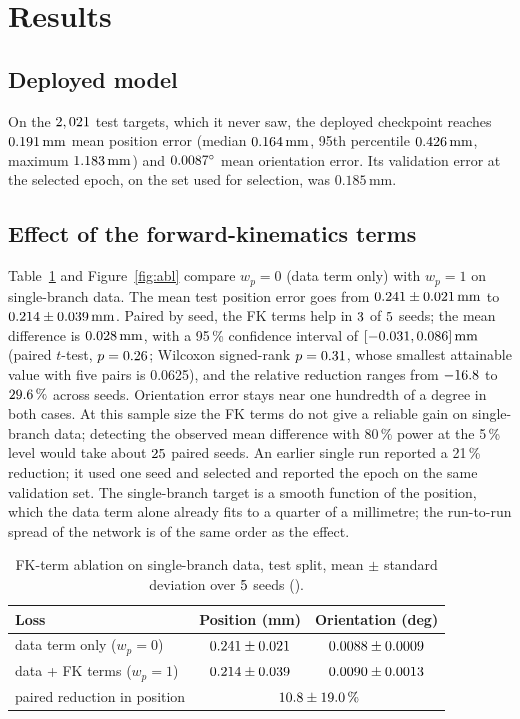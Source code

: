 \documentclass[11pt]{article}
\newcommand{\mm}{\,\mathrm{mm}}
\newcommand{\repo}[1]{\texttt{\detokenize{#1}}}
\begin{document}
\section{Results}
\label{sec:results}
\subsection{Deployed model}
On the $2,021$ test targets, which it never saw, the deployed checkpoint
reaches $\shipTestPos\mm$ mean position error (median $\shipTestMed\mm$,
95th percentile $\shipTestPninetyfive\mm$, maximum $\shipTestMax\mm$) and
$0.0087^\circ$ mean orientation error. Its validation error at the
selected epoch, on the set used for selection, was $0.185\mm$.

\subsection{Effect of the forward-kinematics terms}
Table~\ref{tab:abl} and Figure~\ref{fig:abl} compare $w_p=0$ (data term only)
with $w_p=1$ on single-branch data. The mean test position error goes from
$\ablPosZero\mm$ to $\ablPosOne\mm$. Paired by seed, the FK terms help in
$3$ of $5$ seeds; the mean difference is $\ablDiff\mm$, with a
95\,\% confidence interval of $[\ablDiffLo, \ablDiffHi]\mm$ (paired $t$-test,
$p=0.26$; Wilcoxon signed-rank $p=0.31$, whose smallest attainable
value with five pairs is 0.0625), and the relative reduction ranges from
$-16.8$ to $29.6\,\%$ across seeds. Orientation error stays near
one hundredth of a degree in both cases. At this sample size the FK terms do
not give a reliable gain on single-branch data; detecting the observed mean
difference with 80\,\% power at the 5\,\% level would take about
$25$ paired seeds. An earlier single run reported a
21\,\% reduction; it used one seed and selected and reported the epoch on the
same validation set. The single-branch target is a smooth function of the
position, which the data term alone already fits to a quarter of a millimetre;
the run-to-run spread of the network is of the same order as the effect.

\begin{table}[t]
\centering\small
\caption{FK-term ablation on single-branch data, test split, mean $\pm$ standard
deviation over $5$ seeds (\repo{results/seed_study/A_*.json}).}
\label{tab:abl}
\begin{tabular}{lcc}
\toprule
Loss & Position (mm) & Orientation (deg) \\
\midrule
data term only ($w_p=0$) & $0.241 \pm 0.021$ & $0.0088 \pm 0.0009$ \\
data + FK terms ($w_p=1$) & $0.214 \pm 0.039$ & $0.0090 \pm 0.0013$ \\
\midrule
paired reduction in position & \multicolumn{2}{c}{$10.8 \pm 19.0\,\%$} \\
\bottomrule
\end{tabular}
\end{table}
\end{document}
